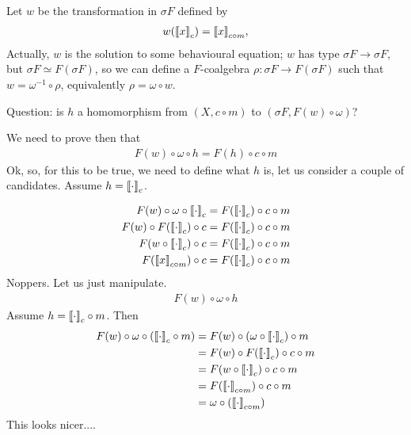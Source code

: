 Let $w$ be the transformation in $\sigma F$ defined by 
\begin{align}
    w({{\llbracket x\rrbracket}}_{c})= {{\llbracket x\rrbracket}}_{c\circ m},
\end{align}
Actually, $w$ is the solution to some behavioural equation; $w$ has type $\sigma F \rightarrow \sigma F$, but $\sigma F\simeq F(\sigma F)$, so we can define a $F$-coalgebra $\rho\colon \sigma F\rightarrow F(\sigma F)$ such that $w=\omega^{-1}\circ\rho$, equivalently $\rho= \omega \circ w$.

Question: is $h$ a homomorphism from $(X, c \circ m)$ to $(\sigma F, F(w)\circ \omega )$?

We need to prove then that 
\begin{align}
    F(w)\circ \omega \circ h = F(h)\circ c\circ m
\end{align}  
Ok, so, for this to be true, we need to define what $h$ is, let us consider a couple of candidates. Assume $h={{\llbracket\cdot\rrbracket}}_{c}$. 

\begin{align}
    F(w)\circ \omega \circ {{\llbracket\cdot\rrbracket}}_{c} &= F({{\llbracket\cdot\rrbracket}}_{c})\circ c\circ m\\
    F(w)\circ F({{\llbracket\cdot\rrbracket}}_{c}) \circ c &= F({{\llbracket\cdot\rrbracket}}_{c})\circ c\circ m\\
    F(w\circ {{\llbracket\cdot\rrbracket}}_{c}) \circ c &= F({{\llbracket\cdot\rrbracket}}_{c})\circ c\circ m\\
    F({{\llbracket x\rrbracket}}_{c\circ m}) \circ c &= F({{\llbracket\cdot\rrbracket}}_{c})\circ c\circ m\\
\end{align} 
Noppers. 
\newpage
Let us just manipulate. 
\begin{align}
    F(w)\circ \omega \circ h 
\end{align}  
Assume $h={{\llbracket\cdot\rrbracket}}_{c}\circ m$. Then
\begin{align}
    F(w)\circ \omega \circ ({{\llbracket\cdot\rrbracket}}_{c}\circ m) &=
    F(w)\circ (\omega \circ {{\llbracket\cdot\rrbracket}}_{c})\circ m \\
    &=F(w)\circ F({{\llbracket\cdot\rrbracket}}_{c})\circ c \circ m \\
    &=F(w\circ {{\llbracket\cdot\rrbracket}}_{c})\circ c \circ m \\
    &=F({{\llbracket\cdot\rrbracket}}_{c\circ m})\circ c \circ m\\
    &=\omega \circ ({{\llbracket\cdot\rrbracket}}_{c\circ m})
\end{align} 
This looks nicer....

